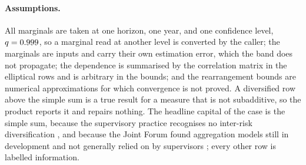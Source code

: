 \paragraph{Assumptions.}
All marginals are taken at one horizon, one year, and one confidence level, $q=0.999$, so a marginal read at another level
is converted by the caller; the marginals are inputs and carry their own estimation error, which the band does not propagate;
the dependence is summarised by the correlation matrix in the elliptical rows and is arbitrary in the bounds; and the
rearrangement bounds are numerical approximations for which convergence is not proved. A diversified row above the simple sum is
a true result for a measure that is not subadditive, so the product reports it and repairs nothing. The headline capital of the
case is the simple sum, because the supervisory practice recognises no inter-risk diversification
\citep{aggregation-stress:ecb2018}, and because the Joint Forum found aggregation models still in development and not generally
relied on by supervisors \citep{aggregation-stress:jointforum2010}; every other row is labelled information.

